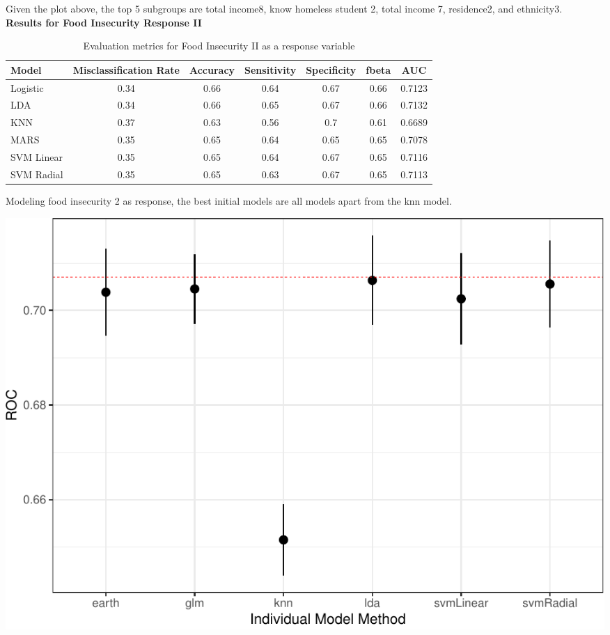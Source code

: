 \documentclass[
  10pt,
]{article}
\begin{document}
Given the plot above, the top 5 subgroups are total income8, know homeless student 2, total income 7, residence2, and ethnicity3.\\

\textbf{Results for Food Insecurity Response II}

\begin{table}[H]

\caption{\label{tab:unnamed-chunk-21}Evaluation metrics for Food Insecurity II  as a response variable}
\centering
\fontsize{12}{14}\selectfont
\begin{tabular}[t]{lcccccc}
\toprule
Model & Misclassification Rate & Accuracy & Sensitivity & Specificity & fbeta & AUC\\
\midrule
Logistic & 0.34 & 0.66 & 0.64 & 0.67 & 0.66 & 0.7123\\
LDA & 0.34 & 0.66 & 0.65 & 0.67 & 0.66 & 0.7132\\
KNN & 0.37 & 0.63 & 0.56 & 0.7 & 0.61 & 0.6689\\
MARS & 0.35 & 0.65 & 0.64 & 0.65 & 0.65 & 0.7078\\
SVM Linear & 0.35 & 0.65 & 0.64 & 0.67 & 0.65 & 0.7116\\
SVM Radial & 0.35 & 0.65 & 0.63 & 0.67 & 0.65 & 0.7113\\
\bottomrule
\end{tabular}
\end{table}

Modeling food insecurity 2 as response, the best initial models are all models apart from the knn model.\\

\begin{center}\includegraphics{final_phase2_report_files/figure-latex/unnamed-chunk-22-1} \end{center}
\end{document}
